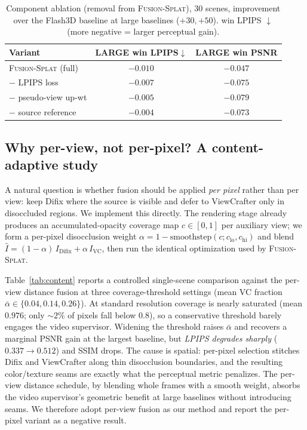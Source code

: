 \documentclass[10pt,twocolumn,letterpaper]{article}
\newcommand{\method}{\textsc{Fusion-Splat}}
\begin{document}
\begin{table}[t]
\centering
\small
\caption{Component ablation (removal from \method), 30 scenes, improvement over
the Flash3D baseline at large baselines ($+30,+50$). win LPIPS $\downarrow$
(more negative = larger perceptual gain).}
\label{tab:control}
\begin{tabular}{lcc}
\toprule
Variant & LARGE win LPIPS$\downarrow$ & LARGE win PSNR \\
\midrule
\method{} (full)             & $\mathbf{-0.010}$ & $-0.047$ \\
\quad $-$ LPIPS loss          & $-0.007$ & $-0.075$ \\
\quad $-$ pseudo-view up-wt   & $-0.005$ & $-0.079$ \\
\quad $-$ source reference    & $-0.004$ & $-0.073$ \\
\bottomrule
\end{tabular}
\end{table}

\subsection{Why per-view, not per-pixel? A content-adaptive study}
\label{sec:contentablation}
A natural question is whether fusion should be applied \emph{per pixel} rather
than per view: keep Difix where the source is visible and defer to ViewCrafter
only in disoccluded regions. We implement this directly. The rendering stage
already produces an accumulated-opacity coverage map $c\in[0,1]$ per auxiliary
view; we form a per-pixel disocclusion weight
$\alpha = 1 - \mathrm{smoothstep}(c; c_{\text{lo}}, c_{\text{hi}})$ and blend
$\hat{I} = (1-\alpha)\,I_{\text{Difix}} + \alpha\,I_{\text{VC}}$, then run the
identical optimization used by \method{}.

Table~\ref{tab:content} reports a controlled single-scene comparison against the
per-view distance fusion at three coverage-threshold settings (mean VC fraction
$\bar\alpha\in\{0.04,0.14,0.26\}$). At standard resolution coverage is nearly
saturated (mean $0.976$; only ${\sim}2\%$ of pixels fall below $0.8$), so a
conservative threshold barely engages the video supervisor. Widening the
threshold raises $\bar\alpha$ and recovers a marginal PSNR gain at the largest
baseline, but \emph{LPIPS degrades sharply} ($0.337\!\to\!0.512$) and SSIM drops.
The cause is spatial: per-pixel selection stitches Difix and ViewCrafter along
thin disocclusion boundaries, and the resulting color/texture seams are exactly
what the perceptual metric penalizes. The per-view distance schedule, by
blending whole frames with a smooth weight, absorbs the video supervisor's
geometric benefit at large baselines without introducing seams. We therefore
adopt per-view fusion as our method and report the per-pixel variant as a
negative result.
\end{document}
